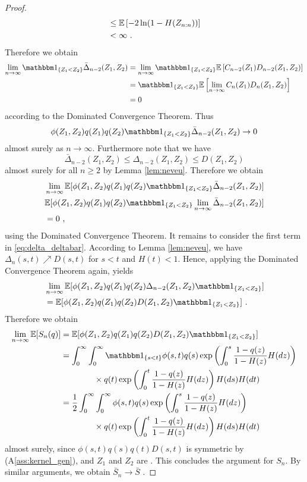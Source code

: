 \begin{lemma}
\begin{proof}
\begin{align*}
		&\leq \mathbb{E}\left[-2\ln(1-H(Z_{n:n}))\right]\\
		& < \infty\textrm{ .}
		\end{align*}
		Therefore we obtain		
		\begin{align*}
			\lim\limits_{n\to\infty} \I{Z_1<Z_2} \bar\Delta_{n-2}(Z_1, Z_2) &= \lim\limits_{n\to\infty}\I{Z_1<Z_2} \E\left[C_{n-2}(Z_1)D_{n-2}(Z_1,Z_2)\right]\\ 
			&= \I{Z_1<Z_2} \E\left[\lim\limits_{n\to\infty}C_n(Z_1)D_n(Z_1,Z_2)\right]\\ 
			&= 0 
		\end{align*}
		according to the Dominated Convergence Theorem. Thus 
		$$\phi(Z_1,Z_2)q(Z_1)q(Z_2)\I{Z_1<Z_2} \bar\Delta_{n-2}(Z_1,Z_2) \to 0$$
		almost surely as $n\to\infty$. Furthermore note that we have 
		$$\bar\Delta_{n-2}(Z_1,Z_2)\leq \Delta_{n-2}(Z_1,Z_2) \leq D(Z_1,Z_2)$$
		almost surely for all $n\geq 2$ by Lemma \ref{lem:neveu}. Therefore we obtain
		\begin{align*}
			&\lim\limits_{n\to\infty} \E[\phi(Z_1,Z_2)q(Z_1)q(Z_2)\I{Z_1<Z_2} \bar\Delta_{n-2}(Z_1,Z_2)] \\
			& \E[\phi(Z_1,Z_2)q(Z_1)q(Z_2)\I{Z_1<Z_2} \lim\limits_{n\to\infty} \bar\Delta_{n-2}(Z_1,Z_2)] \\
			&= 0\mcomma
		\end{align*}
		using the Dominated Convergence Theorem.
		It remains to consider the first term in \eqref{eq:delta_deltabar}. According to Lemma \ref{lem:neveu}, we have $\Delta_{n}(s,t) \nearrow D(s,t)$ for $s<t$ and $H(t)<1$. Hence, applying the Dominated Convergence Theorem again, yields
		\begin{align*}
			&\lim\limits_{n\to\infty}\E[\phi(Z_1,Z_2)q(Z_1)q(Z_2) \Delta_{n-2}(Z_1, Z_2) \I{Z_1<Z_2}] \\
			&= \E[\phi(Z_1,Z_2)q(Z_1)q(Z_2) D(Z_1, Z_2) \I{Z_1<Z_2}]\mdot
		\end{align*}
		Therefore we obtain 
		\begin{align*}
		\lim\limits_{n\to\infty}\E[S_n(q)]&= \E[\phi(Z_1,Z_2)q(Z_1)q(Z_2) D(Z_1, Z_2) \I{Z_1<Z_2}]\\
		&= \int_{0}^{\infty}\int_{0}^{\infty} \I{s<t} \phi(s,t)q(s)\exp\left(\int_{0}^{s} \frac{1-q(z)}{1-H(z)} H(dz)\right) \\
		&\qquad\qquad \times q(t) \exp\left(\int_{0}^{t} \frac{1-q(z)}{1-H(z)} H(dz)\right) H(ds)H(dt)\\
		&= \frac{1}{2}\int_{0}^{\infty}\int_{0}^{\infty}\phi(s,t)q(s) \exp\left(\int_{0}^{s} \frac{1-q(z)}{1-H(z)} H(dz)\right)\\
		&\qquad\qquad \times q(t)\exp\left(\int_{0}^{t} \frac{1-q(z)}{1-H(z)} H(dz)\right) H(ds)H(dt)
		\end{align*}
		almost surely, since $\phi(s,t)q(s)q(t)D(s,t)$ is symmetric by (A\ref{ass:kernel_gen}), and $Z_1$ and $Z_2$ are \iid. This concludes the argument for $S_n$. By similar arguments, we obtain $\bar{S}_n \to \bar{S}$ \wpo. 
	\end{proof}
\end{lemma}
%
%
%
%
